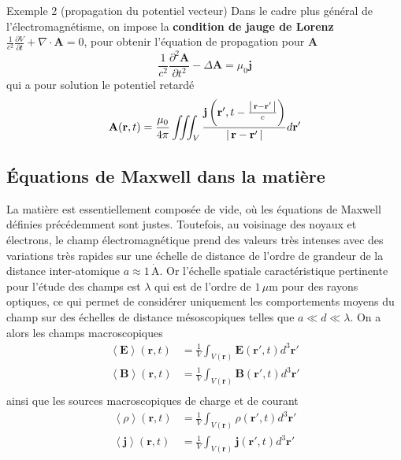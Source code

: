         \begin{demo}{Exemple 2 (propagation du potentiel vecteur)}
            Dans le cadre plus général de l’électromagnétisme, on impose la \textbf{condition de jauge de Lorenz} $\frac{1}{c^2} \frac{\partial V}{\partial t} + \nabla \cdot \mathbf{A} = 0$, pour obtenir l’équation de propagation pour $\mathbf{A}$
            \[ \frac{1}{c^2} \frac{\partial^2 \mathbf{A}}{\partial t^2} - \Delta \mathbf{A} = \mu_0 \mathbf{j} \]   
            qui a pour solution le potentiel retardé 
            \[ \mathbf{A}(\mathbf{r},t) = \frac{\mu_0}{4 \pi} \iiint_V \frac{\mathbf{j}\left(\mathbf{r}', t - \frac{\left\lvert \, \mathbf{r} - \mathbf{r}' \, \right\rvert}{c}\right)}{\left\lvert \, \mathbf{r} - \mathbf{r}' \, \right\rvert} d\mathbf{r}' \] 
        \end{demo}

    \subsection{Équations de Maxwell dans la matière}

        La matière est essentiellement composée de vide, où les équations de Maxwell définies précédemment sont justes. Toutefois, au voisinage des noyaux et électrons, le champ électromagnétique prend des valeurs très intenses avec des variations très rapides sur une échelle de distance de l’ordre de grandeur de la distance inter-atomique $a \approx 1\,\dot{\text{A}}$. Or l’échelle spatiale caractéristique pertinente pour l’étude des champs est $\lambda$ qui est de l’ordre de $1 \, \mu\text{m}$ pour des rayons optiques, ce qui permet de considérer uniquement les comportements moyens du champ sur des échelles de distance mésoscopiques telles que $a \ll d \ll \lambda$. On a alors les champs macroscopiques
        \begin{align*}
            \left<\mathbf{E}\right>(\mathbf{r},t) &= \frac{1}{V} \int_{V(\mathbf{r})} \mathbf{E}(\mathbf{r}',t) d^3 \mathbf{r}' \\
            \left<\mathbf{B}\right>(\mathbf{r},t) &= \frac{1}{V} \int_{V(\mathbf{r})} \mathbf{B}(\mathbf{r}',t) d^3 \mathbf{r}' \\
        \end{align*}
        ainsi que les sources macroscopiques de charge et de courant 
        \begin{align*}
            \left<\rho\right>(\mathbf{r},t) &= \frac{1}{V} \int_{V(\mathbf{r})} \rho(\mathbf{r}',t) d^3 \mathbf{r}' \\
            \left<\mathbf{j}\right>(\mathbf{r},t) &= \frac{1}{V} \int_{V(\mathbf{r})} \mathbf{j}(\mathbf{r}',t) d^3 \mathbf{r}' \\
        \end{align*}

